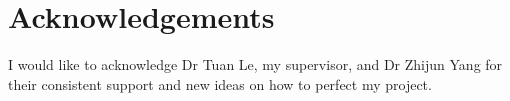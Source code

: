 
\chapter*{Acknowledgements}
\thispagestyle{empty}

I would like to acknowledge Dr Tuan Le, my supervisor, and Dr Zhijun Yang for their consistent support and new ideas on how to perfect my project.

\clearpage